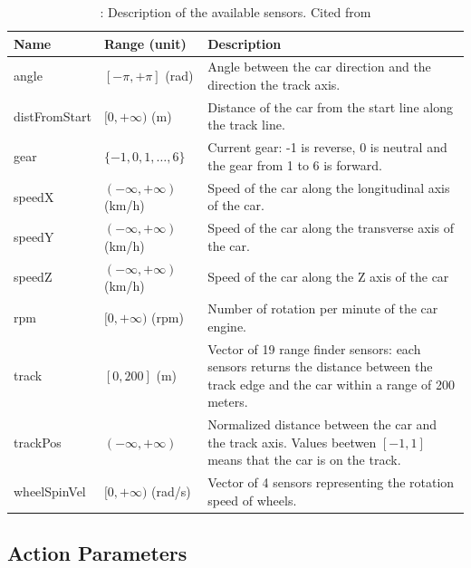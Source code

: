 \documentclass[declaration,shortabstract,english,inz]{iithesis}
\begin{document}
\begin{table}[h]
    \centering
    \begin{tabular}{ |p{2.5cm}|p{2.8cm}|p{8cm}|}
     \hline
     \textbf{Name} & \textbf{Range (unit)} & \textbf{Description} \\ 
     \hline
     angle & $[-\pi, +\pi]$ (rad) & Angle between the car direction and the direction the track axis. \\  
     \hline
     distFromStart & $[0, +\infty)$ (m) & Distance of the car from the start line along the track line. \\
     \hline
     gear & $ \{ -1,0,1, \dots, 6 \} $ & Current gear: -1 is reverse, 0 is neutral and the gear from 1 to 6 is forward. \\
     \hline
     speedX & $ ( -\infty, +\infty ) $ (km/h) & Speed of the car along the longitudinal axis of the car. \\
     \hline
     speedY & $ ( -\infty, +\infty ) $ (km/h) & Speed of the car along the transverse axis of the car. \\
     \hline
     speedZ & $ ( -\infty, +\infty ) $ (km/h) & Speed of the car along the Z axis of the car \\
     \hline
     rpm & $ [0, +\infty ) $ (rpm) & Number of rotation per minute of the car engine. \\
     \hline        
     track &  $[0, 200]$ (m) & Vector of 19 range finder sensors: each sensors returns the distance between the track edge and the car within a range of 200 meters. \\
     \hline
     trackPos & $( -\infty, +\infty )$ & Normalized distance between the car and the track axis. Values beetwen $[-1, 1]$ means that the car is on the track. \\
     \hline
     wheelSpinVel & $[0, +\infty)$ (rad/s) & Vector of 4 sensors representing the rotation speed of wheels. \\
     \hline
    \end{tabular}
     \caption{\label{tab:torcs_sensors}: Description of the available sensors. Cited from \cite{scrc_manual}}
\end{table}

\subsection{Action Parameters}
\end{document}
